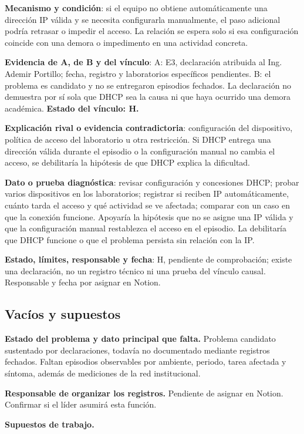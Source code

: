	\textbf{Mecanismo y condición}: si el equipo no obtiene automáticamente una dirección IP válida y se necesita configurarla manualmente, el paso adicional podría retrasar o impedir el acceso. La relación se espera solo si esa configuración coincide con una demora o impedimento en una actividad concreta.

	\textbf{Evidencia de A, de B y del vínculo}: A: E3, declaración atribuida al Ing. Ademir Portillo; fecha, registro y laboratorios específicos pendientes. B: el problema es candidato y no se entregaron episodios fechados. La declaración no demuestra por sí sola que DHCP sea la causa ni que haya ocurrido una demora académica. \textbf{Estado del vínculo: H.}

	\textbf{Explicación rival o evidencia contradictoria}: configuración del dispositivo, política de acceso del laboratorio u otra restricción. Si DHCP entrega una dirección válida durante el episodio o la configuración manual no cambia el acceso, se debilitaría la hipótesis de que DHCP explica la dificultad.

	\textbf{Dato o prueba diagnóstica}: revisar configuración y concesiones DHCP; probar varios dispositivos en los laboratorios; registrar si reciben IP automáticamente, cuánto tarda el acceso y qué actividad se ve afectada; comparar con un caso en que la conexión funcione. Apoyaría la hipótesis que no se asigne una IP válida y que la configuración manual restablezca el acceso en el episodio. La debilitaría que DHCP funcione o que el problema persista sin relación con la IP.

	\textbf{Estado, límites, responsable y fecha}: H, pendiente de comprobación; existe una declaración, no un registro técnico ni una prueba del vínculo causal. Responsable y fecha por asignar en Notion.

\subsection{Vacíos y supuestos}

	\textbf{Estado del problema y dato principal que falta.} Problema candidato sustentado por declaraciones, todavía no documentado mediante registros fechados. Faltan episodios observables por ambiente, periodo, tarea afectada y síntoma, además de mediciones de la red institucional.

	\textbf{Responsable de organizar los registros.} Pendiente de asignar en Notion. Confirmar si el líder asumirá esta función.

	\textbf{Supuestos de trabajo.}

